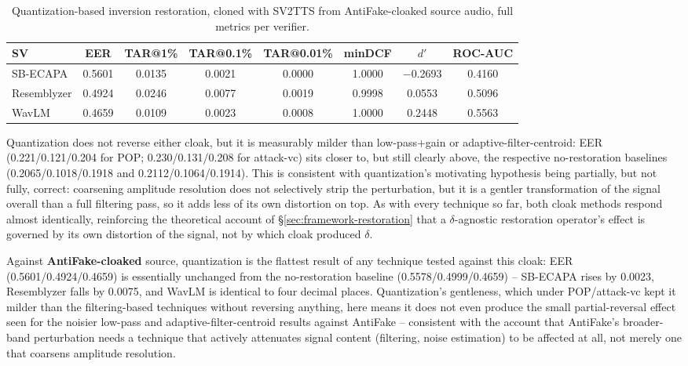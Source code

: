 \documentclass[11pt]{article}
\begin{document}
\begin{table}[H]
\centering
\caption{Quantization-based inversion restoration, cloned with SV2TTS
from AntiFake-cloaked source audio, full metrics per verifier.}
\label{tab:restoration-quantization-antifake-results}
\begin{tabular}{lccccccc}
\toprule
SV & EER & TAR@1\% & TAR@0.1\% & TAR@0.01\% & minDCF & $d'$ & ROC-AUC \\
\midrule
SB-ECAPA    & 0.5601 & 0.0135 & 0.0021 & 0.0000 & 1.0000 & $-$0.2693 & 0.4160 \\
Resemblyzer & 0.4924 & 0.0246 & 0.0077 & 0.0019 & 0.9998 & 0.0553 & 0.5096 \\
WavLM       & 0.4659 & 0.0109 & 0.0023 & 0.0008 & 1.0000 & 0.2448 & 0.5563 \\
\bottomrule
\end{tabular}
\end{table}

Quantization does not reverse either cloak, but it is measurably milder
than low-pass+gain or adaptive-filter-centroid: EER (0.221/0.121/0.204
for POP; 0.230/0.131/0.208 for attack-vc) sits closer to, but still
clearly above, the respective no-restoration baselines
(0.2065/0.1018/0.1918 and 0.2112/0.1064/0.1914). This is consistent
with quantization's motivating hypothesis being partially, but not
fully, correct: coarsening amplitude resolution does not selectively
strip the perturbation, but it is a gentler transformation of the
signal overall than a full filtering pass, so it adds less of its own
distortion on top. As with every technique so far, both cloak methods
respond almost identically, reinforcing the theoretical account of
\S\ref{sec:framework-restoration} that a $\delta$-agnostic restoration
operator's effect is governed by its own distortion of the signal, not
by which cloak produced $\delta$.

Against \textbf{AntiFake-cloaked} source, quantization is the flattest
result of any technique tested against this cloak: EER
(0.5601/0.4924/0.4659) is essentially unchanged from the no-restoration
baseline (0.5578/0.4999/0.4659) -- SB-ECAPA rises by 0.0023,
Resemblyzer falls by 0.0075, and WavLM is identical to four decimal
places. Quantization's gentleness, which under POP/attack-vc kept it
milder than the filtering-based techniques without reversing anything,
here means it does not even produce the small partial-reversal effect
seen for the noisier low-pass and adaptive-filter-centroid results
against AntiFake -- consistent with the account that AntiFake's
broader-band perturbation needs a technique that actively attenuates
signal content (filtering, noise estimation) to be affected at all, not
merely one that coarsens amplitude resolution.
\end{document}
